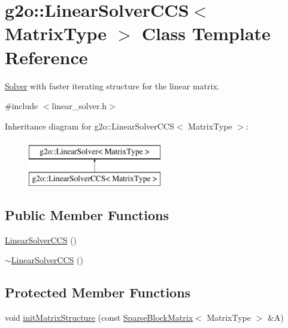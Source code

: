 \hypertarget{classg2o_1_1_linear_solver_c_c_s}{}\section{g2o\+:\+:Linear\+Solver\+C\+CS$<$ Matrix\+Type $>$ Class Template Reference}
\label{classg2o_1_1_linear_solver_c_c_s}


\mbox{\hyperlink{classg2o_1_1_solver}{Solver}} with faster iterating structure for the linear matrix.  




{\ttfamily \#include $<$linear\+\_\+solver.\+h$>$}

Inheritance diagram for g2o\+:\+:Linear\+Solver\+C\+CS$<$ Matrix\+Type $>$\+:\begin{figure}[H]
\begin{center}
\leavevmode
\includegraphics[height=2.000000cm]{classg2o_1_1_linear_solver_c_c_s}
\end{center}
\end{figure}
\subsection*{Public Member Functions}
\begin{DoxyCompactItemize}
\item 
\mbox{\hyperlink{classg2o_1_1_linear_solver_c_c_s_aa4a8b0612a60769481c40d2d1a6b03ce}{Linear\+Solver\+C\+CS}} ()
\item 
\mbox{\hyperlink{classg2o_1_1_linear_solver_c_c_s_aa131fa8ea836eafdc1313fdf3a4217f9}{$\sim$\+Linear\+Solver\+C\+CS}} ()
\end{DoxyCompactItemize}
\subsection*{Protected Member Functions}
\begin{DoxyCompactItemize}
\item 
void \mbox{\hyperlink{classg2o_1_1_linear_solver_c_c_s_a070138d7e2a68a576e015f5073a4a464}{init\+Matrix\+Structure}} (const \mbox{\hyperlink{classg2o_1_1_sparse_block_matrix}{Sparse\+Block\+Matrix}}$<$ Matrix\+Type $>$ \&A)
\end{DoxyCompactItemize}
